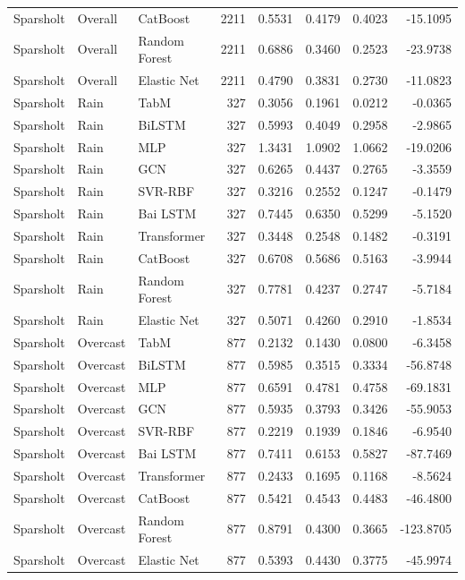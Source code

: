 \begin{longtable}{lllrrrrr}
Sparsholt & Overall & CatBoost & 2211 & 0.5531 & 0.4179 & 0.4023 & -15.1095 \\
Sparsholt & Overall & Random Forest & 2211 & 0.6886 & 0.3460 & 0.2523 & -23.9738 \\
Sparsholt & Overall & Elastic Net & 2211 & 0.4790 & 0.3831 & 0.2730 & -11.0823 \\
\midrule
Sparsholt & Rain & TabM & 327 & 0.3056 & 0.1961 & 0.0212 & -0.0365 \\
Sparsholt & Rain & BiLSTM & 327 & 0.5993 & 0.4049 & 0.2958 & -2.9865 \\
Sparsholt & Rain & MLP & 327 & 1.3431 & 1.0902 & 1.0662 & -19.0206 \\
Sparsholt & Rain & GCN & 327 & 0.6265 & 0.4437 & 0.2765 & -3.3559 \\
Sparsholt & Rain & SVR-RBF & 327 & 0.3216 & 0.2552 & 0.1247 & -0.1479 \\
Sparsholt & Rain & Bai LSTM & 327 & 0.7445 & 0.6350 & 0.5299 & -5.1520 \\
Sparsholt & Rain & Transformer & 327 & 0.3448 & 0.2548 & 0.1482 & -0.3191 \\
Sparsholt & Rain & CatBoost & 327 & 0.6708 & 0.5686 & 0.5163 & -3.9944 \\
Sparsholt & Rain & Random Forest & 327 & 0.7781 & 0.4237 & 0.2747 & -5.7184 \\
Sparsholt & Rain & Elastic Net & 327 & 0.5071 & 0.4260 & 0.2910 & -1.8534 \\
\midrule
Sparsholt & Overcast & TabM & 877 & 0.2132 & 0.1430 & 0.0800 & -6.3458 \\
Sparsholt & Overcast & BiLSTM & 877 & 0.5985 & 0.3515 & 0.3334 & -56.8748 \\
Sparsholt & Overcast & MLP & 877 & 0.6591 & 0.4781 & 0.4758 & -69.1831 \\
Sparsholt & Overcast & GCN & 877 & 0.5935 & 0.3793 & 0.3426 & -55.9053 \\
Sparsholt & Overcast & SVR-RBF & 877 & 0.2219 & 0.1939 & 0.1846 & -6.9540 \\
Sparsholt & Overcast & Bai LSTM & 877 & 0.7411 & 0.6153 & 0.5827 & -87.7469 \\
Sparsholt & Overcast & Transformer & 877 & 0.2433 & 0.1695 & 0.1168 & -8.5624 \\
Sparsholt & Overcast & CatBoost & 877 & 0.5421 & 0.4543 & 0.4483 & -46.4800 \\
Sparsholt & Overcast & Random Forest & 877 & 0.8791 & 0.4300 & 0.3665 & -123.8705 \\
Sparsholt & Overcast & Elastic Net & 877 & 0.5393 & 0.4430 & 0.3775 & -45.9974 \\

\end{longtable}
